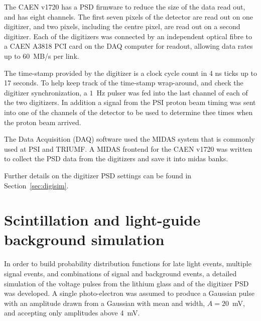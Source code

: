 \documentclass[letter,twocolumn,preprint,3p]{elsarticle}
\begin{document}
The CAEN v1720 has a PSD firmware to reduce the size of the data read
out, and has eight channels.  The first seven pixels of the detector
are read out on one digitizer, and two pixels, including the centre
pixel, are read out on a second digitizer.  Each of the digitizers was
connected by an independent optical fibre to a CAEN A3818 PCI card on
the DAQ computer for readout, allowing data rates up to 60~MB/s per
link.

The time-stamp provided by the digitizer is a clock cycle count in 4 ns
ticks up to 17 seconds.  To help keep track of the time-stamp
wrap-around, and check the digitizer synchronization, a $1$~Hz pulser
was fed into the last channel of each of the two digitizers.  In
addition a signal from the PSI proton beam timing was sent into one of
the channels of the detector to be used to determine thee times when
the proton beam arrived.

The Data Acquisition (DAQ) software used the MIDAS system that is
commonly used at PSI and TRIUMF.  A MIDAS frontend for the CAEN v1720
was written to collect the PSD data from the digitizers and save it
into midas banks. 

Further details on the digitizer PSD settings can be found in
Section~\ref{sec:digisim}.  


\section{ Scintillation and light-guide background simulation }\label{sec:sim}

In order to build probability distribution functions for late light
events, multiple signal events, and combinations of signal and
background events, a detailed simulation of the voltage pulses from
the lithium glass and of the digitizer PSD was developed.  A single
photo-electron was assumed to produce a Gaussian pulse with an
amplitude drawn from a Gaussian with mean and width, $A=20$~mV, and
accepting only amplitudes above 4~mV.
\end{document}
